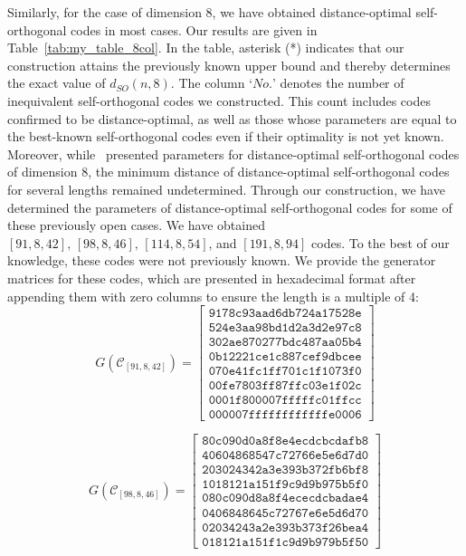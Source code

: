 \documentclass{article}
\theoremstyle{definition}
\theoremstyle{remark}
\begin{document}
Similarly, for the case of dimension 8, we have obtained distance-optimal self-orthogonal codes in most cases.  Our results are given in Table~\ref{tab:my_table_8col}. In the table, asterisk (*) indicates that our construction attains the previously known upper bound and thereby determines the exact value of $d_{SO}(n, 8)$. The column `$No.$' denotes the number of inequivalent self-orthogonal codes we constructed. This count includes codes confirmed to be distance-optimal, as well as those whose parameters are equal to the best-known self-orthogonal codes even if their optimality is not yet known. Moreover, while~\cite{Li2025} presented parameters for distance-optimal self-orthogonal codes of dimension $8$, the minimum distance of distance-optimal self-orthogonal codes for several lengths remained undetermined. Through our construction, we have determined the parameters of distance-optimal self-orthogonal codes for some of these previously open cases. We have obtained $[91, 8, 42],\, [98, 8, 46],\,[114, 8, 54]$, and $[191, 8, 94]$ codes. To the best of our knowledge, these codes were not previously known. We provide the generator matrices for these codes, which are presented in hexadecimal format after appending them with zero columns to ensure the length is a multiple of 4:
\[
G(\mathcal{C}_{[91, 8, 42]})=\left[
\begin{array}{c}
\texttt{9178c93aad6db724a17528e} \\
\texttt{524e3aa98bd1d2a3d2e97c8} \\
\texttt{302ae870277bdc487aa05b4} \\
\texttt{0b12221ce1c887cef9dbcee} \\
\texttt{070e41fc1ff701c1f1073f0} \\
\texttt{00fe7803ff87ffc03e1f02c} \\
\texttt{0001f800007fffffc01ffcc} \\
\texttt{000007ffffffffffffe0006}
\end{array}
\right]
\]

\[
G(\mathcal{C}_{[98, 8, 46]})=\left[
\begin{array}{c}
\texttt{80c090d0a8f8e4ecdcbcdafb8} \\
\texttt{40604868547c72766e5e6d7d0} \\
\texttt{203024342a3e393b372fb6bf8} \\
\texttt{1018121a151f9c9d9b975b5f0} \\
\texttt{080c090d8a8f4ececdcbadae4} \\
\texttt{0406848645c72767e6e5d6d70} \\
\texttt{02034243a2e393b373f26bea4} \\
\texttt{018121a151f1c9d9b979b5f50}
\end{array}
\right]
\]
\end{document}
